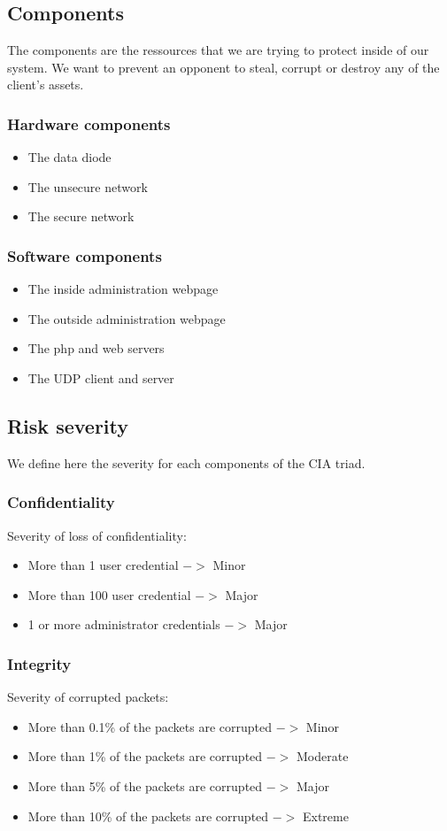 \documentclass[a4paper,11pt]{article}
\begin{document}
\subsection{Components}
The components are the ressources that we are trying to protect inside of our system. We want to prevent an opponent to steal, corrupt or destroy any of the client's assets.
\subsubsection{Hardware components}
\begin{itemize}
\item The data diode
\item The unsecure network
\item The secure network
\end{itemize}
\subsubsection{Software components}
\begin{itemize}
\item The inside administration webpage
\item The outside administration webpage
\item The php and web servers
\item The UDP client and server
\end{itemize}
\subsection{Risk severity}
We define here the severity for each components of the CIA triad.
\subsubsection{Confidentiality}
Severity of loss of confidentiality:
\begin{itemize}
\item More than 1 user credential $->$ Minor
\item More than 100 user credential $->$ Major
\item 1 or more administrator credentials $ ->$ Major

\end{itemize}
\subsubsection{Integrity}
Severity of corrupted packets:
\begin{itemize}
\item More than 0.1\% of the packets are corrupted $->$ Minor
\item More than 1\% of the packets are corrupted $->$ Moderate
\item More than 5\% of the packets are corrupted $->$ Major
\item More than 10\% of the packets are corrupted $->$ Extreme
\end{itemize}
\end{document}
